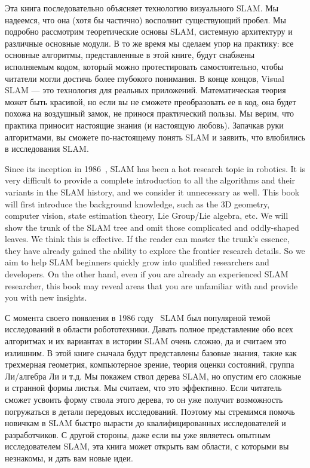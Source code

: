 \begin{Russian}
    Эта книга последовательно объясняет технологию визуального SLAM. Мы надеемся, что она (хотя бы частично) восполнит существующий пробел. Мы подробно рассмотрим теоретические основы SLAM, системную архитектуру и различные основные модули. В то же время мы сделаем упор на практику: все основные алгоритмы, представленные в этой книге, будут снабжены исполняемым кодом, который можно протестировать самостоятельно, чтобы читатели могли достичь более глубокого понимания. В конце концов, Visual SLAM --- это технология для реальных приложений. Математическая теория может быть красивой, но если вы не сможете преобразовать ее в код, она будет похожа на воздушный замок, не принося практический пользы. Мы верим, что практика приносит настоящие знания (и настоящую любовь). Запачкав руки алгоритмами, вы сможете по-настоящему понять SLAM и заявить, что влюбились в исследования SLAM.
\end{Russian}

\begin{English}
    Since its inception in 1986~\cite{Smith1986}, SLAM has been a hot research topic in robotics. It is very difficult to provide a complete introduction to all the algorithms and their variants in the SLAM history, and we consider it unnecessary as well. This book will first introduce the background knowledge, such as the 3D geometry, computer vision, state estimation theory, Lie Group/Lie algebra, etc. We will show the trunk of the SLAM tree and omit those complicated and oddly-shaped leaves. We think this is effective. If the reader can master the trunk's essence, they have already gained the ability to explore the frontier research details. So we aim to help SLAM beginners quickly grow into qualified researchers and developers. On the other hand, even if you are already an experienced SLAM researcher, this book may reveal areas that you are unfamiliar with and provide you with new insights.    
\end{English}

\begin{Russian}
    С момента своего появления в 1986 году~\cite{Smith1986} SLAM был популярной темой исследований в области робототехники. Давать полное представление обо всех алгоритмах и их вариантах в истории SLAM очень сложно, да и считаем это излишним. В этой книге сначала будут представлены базовые знания, такие как трехмерная геометрия, компьютерное зрение, теория оценки состояний, группа Ли/алгебра Ли и т.д. Мы покажем ствол дерева SLAM, но опустим его сложные и странной формы листья. Мы считаем, что это эффективно. Если читатель сможет усвоить форму ствола этого дерева, то он уже получит возможность погружаться в детали передовых исследований. Поэтому мы стремимся помочь новичкам в SLAM быстро вырасти до квалифицированных исследователей и разработчиков. С другой стороны, даже если вы уже являетесь опытным исследователем SLAM, эта книга может открыть вам области, с которыми вы незнакомы, и дать вам новые идеи.
\end{Russian}

